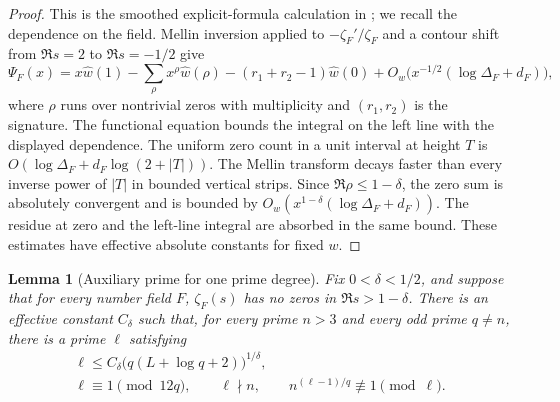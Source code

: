 \documentclass[11pt]{article}
\newtheorem{lemma}[theorem]{Lemma}
\theoremstyle{definition}
\theoremstyle{remark}
\begin{document}
\begin{proof}
This is the smoothed explicit-formula calculation in
\cite[Section 9.2, especially (9.9)]{openai-artin}; we recall the
dependence on the field. Mellin inversion applied to $-\zeta_F'/\zeta_F$
and a contour shift from $\Re s=2$ to $\Re s=-1/2$ give
\[
 \Psi_F(x)=x\widehat w(1)
 -\sum_\rho x^\rho\widehat w(\rho)
 -(r_1+r_2-1)\widehat w(0)
 +O_w\bigl(x^{-1/2}(\log\Delta_F+d_F)\bigr),
\]
where $\rho$ runs over nontrivial zeros with multiplicity and
$(r_1,r_2)$ is the signature. The functional equation bounds the
integral on the left line with the displayed dependence. The
uniform zero count in a unit interval at height $T$ is
$O(\log\Delta_F+d_F\log(2+|T|))$. The Mellin transform decays
faster than every inverse power of $|T|$ in bounded vertical strips.
Since $\Re\rho\le1-\delta$, the zero sum is absolutely convergent
and is bounded by
$O_w(x^{1-\delta}(\log\Delta_F+d_F))$. The residue at zero and
the left-line integral are absorbed in the same bound. These
estimates have effective absolute constants for fixed $w$.
\end{proof}

\begin{lemma}[Auxiliary prime for one prime degree]\label{lem:aux}
Fix $0<\delta<1/2$, and suppose that for every number field $F$,
$\zeta_F(s)$ has no zeros in $\Re s>1-\delta$. There is an
effective constant
$C_\delta$ such that, for every prime $n>3$ and every odd prime
$q\ne n$, there is a prime $\ell$ satisfying
\begin{gather}
 \ell\le C_\delta\bigl(q(L+\log q+2)\bigr)^{1/\delta},
       \label{eq:aux-bound}\\
 \ell\equiv1\pmod{12q},\qquad \ell\nmid n,\qquad
 n^{(\ell-1)/q}\not\equiv1\pmod\ell.
       \label{eq:aux-properties}
\end{gather}
\end{lemma}
\end{document}
